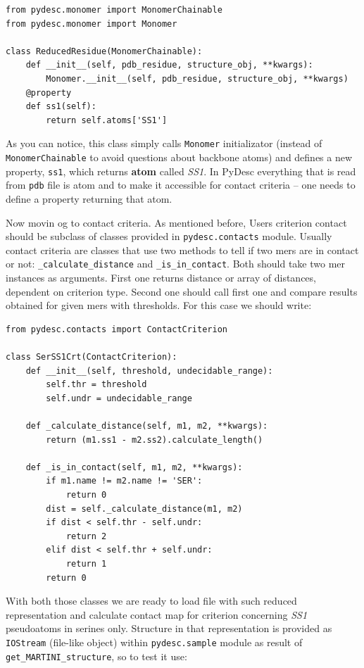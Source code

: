 \documentclass{article}
\begin{document}
\begin{lstlisting}
from pydesc.monomer import MonomerChainable
from pydesc.monomer import Monomer

class ReducedResidue(MonomerChainable):
    def __init__(self, pdb_residue, structure_obj, **kwargs):
        Monomer.__init__(self, pdb_residue, structure_obj, **kwargs)
    @property
    def ss1(self):
        return self.atoms['SS1']
\end{lstlisting}

As you can notice, this class simply calls \texttt{Monomer} initializator (instead of \texttt{MonomerChainable} to avoid questions about backbone atoms) and defines a new property, \texttt{ss1}, which returns \textbf{atom} called \textit{SS1}. In PyDesc everything that is read from \texttt{pdb} file is atom and to make it accessible for contact criteria -- one needs to define a property returning that atom.

Now movin og to contact criteria. As mentioned before, Users criterion contact should be subclass of classes provided in \texttt{pydesc.contacts} module. Usually contact criteria are classes that use two methods to tell if two mers are in contact or not: \texttt{\_{}calculate\_{}distance} and \texttt{\_{}is\_{}in\_{}contact}. Both should take two mer instances as arguments. First one returns distance or array of distances, dependent on criterion type. Second one should call first one and compare results obtained for given mers with thresholds. For this case we should write:

\begin{lstlisting}
from pydesc.contacts import ContactCriterion

class SerSS1Crt(ContactCriterion):
    def __init__(self, threshold, undecidable_range):
        self.thr = threshold
        self.undr = undecidable_range

    def _calculate_distance(self, m1, m2, **kwargs):
        return (m1.ss1 - m2.ss2).calculate_length()

    def _is_in_contact(self, m1, m2, **kwargs):
        if m1.name != m2.name != 'SER':
            return 0
        dist = self._calculate_distance(m1, m2)
        if dist < self.thr - self.undr:
            return 2
        elif dist < self.thr + self.undr:
            return 1
        return 0
\end{lstlisting}

With both those classes we are ready to load file with such reduced representation and calculate contact map for criterion concerning \textit{SS1} pseudoatoms in serines only. Structure in that representation is provided as \texttt{IOStream} (file-like object) within \texttt{pydesc.sample} module as result of \texttt{get\_{}MARTINI\_{}structure}, so to test it use:
\end{document}
